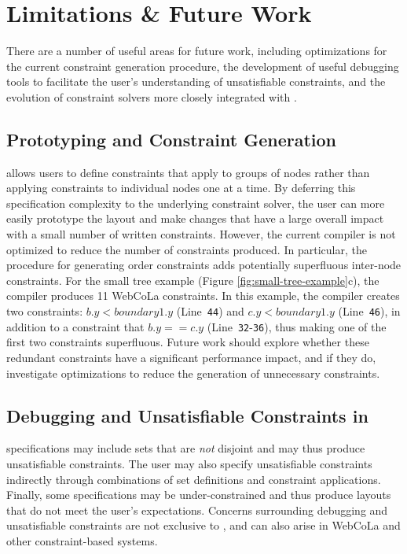 \section{Limitations \& Future Work}
There are a number of useful areas for future work, including optimizations
for the current constraint generation procedure, the development of useful debugging
tools to facilitate the user's understanding of unsatisfiable constraints,
and the evolution of constraint solvers more closely integrated with \projectname.


\vspace{-5px}
\subsection{Prototyping and Constraint Generation}
\projectname allows users to define constraints that apply
to groups of nodes rather than applying constraints to individual
nodes one at a time. By deferring this specification complexity to the underlying constraint
solver, the user can more easily prototype the layout and make changes that
have a large overall impact with a small number of written constraints. However, 
the current \projectname compiler is not optimized to reduce the
number of constraints produced. In particular, the procedure for generating
order constraints adds potentially superfluous inter-node 
constraints. For the small tree example (Figure \ref{fig:small-tree-example}c), 
the \projectname compiler produces 11 WebCoLa constraints.
In this example, the \projectname compiler creates two constraints: $b.y < boundary1.y$ (Line~\texttt{44}) 
and $c.y < boundary1.y$ (Line~\texttt{46}), in addition to a
constraint that $b.y == c.y$ (Line~\texttt{32}-\texttt{36}), thus 
making one of the first two constraints superfluous. 
Future work should explore whether these redundant constraints have a 
significant performance impact, and if they do, investigate 
optimizations to reduce the generation of unnecessary constraints.

\vspace{-7px}
\subsection{Debugging and Unsatisfiable Constraints in \projectname}
\projectname specifications may include sets that 
are \emph{not} disjoint and may thus produce unsatisfiable constraints. 
The user may also specify unsatisfiable constraints indirectly through
combinations of set definitions and constraint applications. 
Finally, some specifications may be under-constrained and thus produce
layouts that do not meet the user's expectations. Concerns surrounding
debugging and unsatisfiable constraints are not exclusive to \projectname, 
and can also arise in WebCoLa and other constraint-based systems. 

